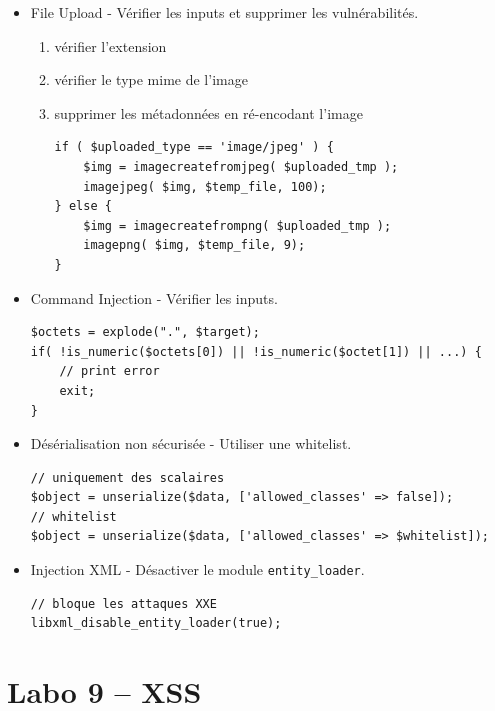 \documentclass[a4paper]{article}
\begin{document}
\begin{itemize}
\begin{example}
\begin{itemize}
\item File Upload - Vérifier les inputs et supprimer les vulnérabilités.
\begin{enumerate}
    \item vérifier l'extension
    \item vérifier le type mime de l'image
    \item supprimer les métadonnées en ré-encodant l'image
\begin{lstlisting}[style=php]
if ( $uploaded_type == 'image/jpeg' ) {
    $img = imagecreatefromjpeg( $uploaded_tmp );
    imagejpeg( $img, $temp_file, 100);
} else {
    $img = imagecreatefrompng( $uploaded_tmp );
    imagepng( $img, $temp_file, 9);
}
\end{lstlisting}
\end{enumerate}

\item Command Injection - Vérifier les inputs.
\begin{lstlisting}[style=php]
$octets = explode(".", $target);
if( !is_numeric($octets[0]) || !is_numeric($octet[1]) || ...) {
    // print error
    exit;
}
\end{lstlisting}

\item Désérialisation non sécurisée - Utiliser une whitelist.
\begin{lstlisting}[style=php]
// uniquement des scalaires
$object = unserialize($data, ['allowed_classes' => false]);
// whitelist
$object = unserialize($data, ['allowed_classes' => $whitelist]);
\end{lstlisting}

\item Injection XML - Désactiver le module \texttt{entity\_loader}.
\begin{lstlisting}[style=php]
// bloque les attaques XXE
libxml_disable_entity_loader(true);
\end{lstlisting}

\end{itemize} \end{example}


\end{itemize}















\section{Labo 9 -- XSS}
\end{document}
